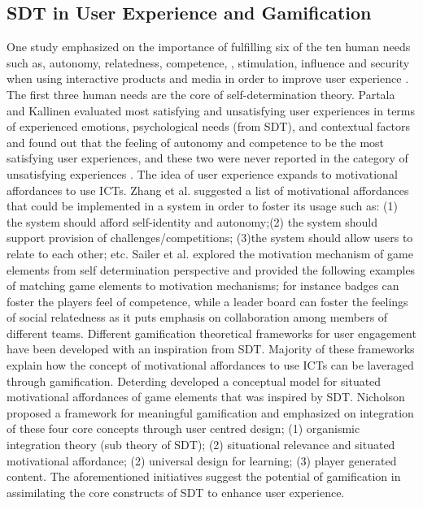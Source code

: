 \documentclass{sig-alternate}
\begin{document}
\subsection{SDT in User Experience and Gamification}
One study emphasized on the importance of fulfilling six of the ten human needs such as, autonomy, relatedness, competence, , stimulation,  influence and security when using interactive products and media in order to improve user experience \cite{wiklund2009:needs}. The first three human needs are the core of self-determination theory. Partala and Kallinen \cite{partala2012:understanding} evaluated most satisfying and unsatisfying user experiences in terms of experienced emotions, psychological needs (from SDT), and contextual factors and found out that the feeling of autonomy and competence to be the most satisfying user experiences, and these two were never reported in the category of unsatisfying experiences \cite{partala2012:understanding}.\newline 
The idea of user experience expands to motivational affordances to use ICTs. Zhang et al.\cite{zhang2008:motivational} suggested a list of motivational affordances that could be implemented in a system in order to foster its usage such as: (1) the system should afford self-identity and autonomy;(2) the system should support provision of challenges/competitions; (3)the system should allow users to relate to each other; etc.
Sailer et al.\cite{sailer2013:psychological} explored the motivation mechanism of game elements from self determination perspective and provided the following examples of matching game elements to motivation mechanisms; for instance badges can foster the players feel of competence, while a leader board can foster the feelings of social relatedness as it puts emphasis on collaboration among members of different teams.\newline
Different gamification theoretical frameworks for user engagement have been developed with an inspiration from SDT. Majority of these frameworks explain how the concept of motivational affordances to use ICTs can be laveraged through gamification. Deterding \cite{deterding2011:situated} developed  a conceptual model for situated motivational affordances of game elements that was inspired by SDT. Nicholson \cite{nicholson2012:user} proposed a framework for meaningful gamification and emphasized on integration of these four core concepts through user centred design; (1) organismic integration theory (sub theory of SDT); (2) situational relevance and situated motivational affordance; (2) universal design for learning; (3) player generated content. The aforementioned initiatives suggest the potential of gamification in assimilating the core constructs of SDT to enhance user experience.\newline 
\end{document}
